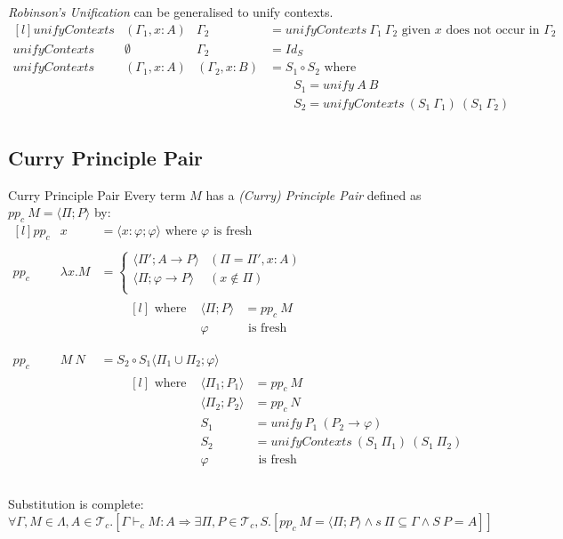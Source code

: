 \textit{Robinson's Unification} can be generalised to unify contexts.
\[\begin{matrix*}[l]
    unifyContexts & (\Gamma_1, x:A) & \Gamma_2 & = unifyContexts \ \Gamma_1 \ \Gamma_2 \text{ given }x \text{ does not occur in } \Gamma_2 \\
    unifyContexts & \emptyset & \Gamma_2 & = Id_S \\
    unifyContexts & (\Gamma_1, x:A) & (\Gamma_2, x:B) & = S_1 \circ S_2 \text{ where}\\
    & & & \qquad S_1 = unify \ A \ B \\
    & & & \qquad S_2 = unifyContexts \ (S_1 \ \Gamma_1) \ (S_1 \ \Gamma_2) \\
\end{matrix*}\]

\subsection{Curry Principle Pair}

\begin{definitionbox}{Curry Principle Pair}
    Every term $M$ has a \textit{(Curry) Principle Pair} defined as $pp_c \ M = \langle \Pi ; P \rangle$ by:
    \[\begin{matrix*}[l]
        pp_c & x & = \langle x: \varphi ; \varphi \rangle \text{ where } \varphi \text{ is fresh} \\
        \\
        pp_c & \lambda x. M & = \begin{cases}
            \langle \Pi' ; A \to P \rangle & (\Pi = \Pi', x:A) \\
            \langle \Pi; \varphi \to P \rangle & (x \not\in \Pi) \\
        \end{cases} \\
        & & \qquad \begin{matrix*}[l]
            \text{ where } & \langle \Pi; P \rangle &= pp_c \ M \\
            & \varphi & \text{ is fresh}  \\
        \end{matrix*} \\
        \\
        pp_c & M \ N & = S_2 \circ S_1 \langle \Pi_1 \cup \Pi_2 ; \varphi \rangle \\
        & & \qquad \begin{matrix*}[l]
            \text{ where } & \langle \Pi_1 ; P_1 \rangle & = pp_c \ M \\
            & \langle \Pi_2 ; P_2 \rangle & = pp_c \ N \\
            & S_1 & = unify \ P_1 \ (P_2 \to \varphi) \\
            & S_2 & = unifyContexts \ (S_1 \ \Pi_1) \ (S_1 \ \Pi_2) \\
            & \varphi & \text{ is fresh} \\
        \end{matrix*} \\
    \end{matrix*}\]
\end{definitionbox}

Substitution is complete:
\[\forall \Gamma, M \in \Lambda, A \in \mathcal{T}_c . [\Gamma \vdash_c M : A \Rightarrow \exists \Pi, P \in \mathcal{T}_c, S . [pp_c \ M = \langle \Pi ; P \rangle \land s \ \Pi \subseteq \Gamma \land S \ P = A]]\]
